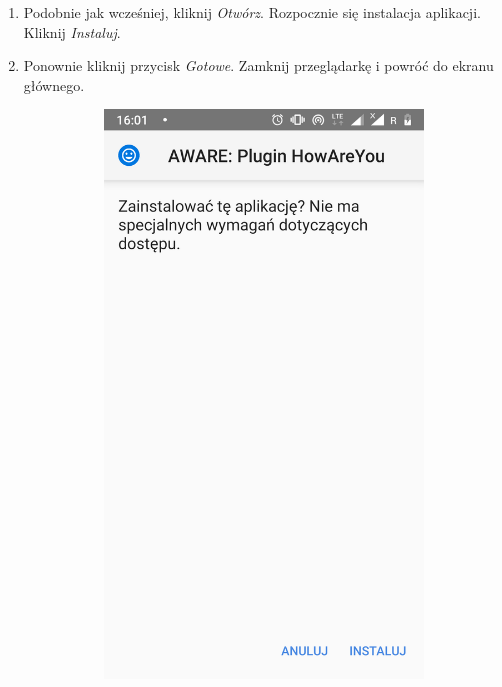 \begin{enumerate}
	\item Podobnie jak wcześniej, kliknij \textit{Otwórz}. Rozpocznie się instalacja aplikacji. Kliknij \textit{Instaluj}. 
	
	\item Ponownie kliknij przycisk \textit{Gotowe}. Zamknij przeglądarkę i powróć do ekranu głównego.
	
	\begin{figure}[H]
		\centering
		\begin{subfigure}{0.35\textwidth}
			\centering
			\includegraphics[scale=0.14]{dodatekA/2_8.png}

\end{subfigure}
\end{figure}
\end{enumerate}
